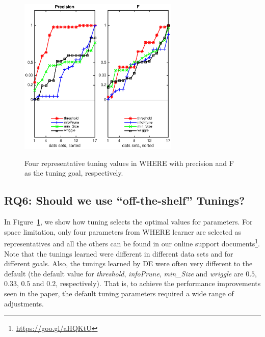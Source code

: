 \documentclass{sig-alternative}
\newcommand{\fig}[1]{Figure~\ref{fig:#1}}
\begin{document}
\begin{figure}[!t]
\begin{center}
\includegraphics[width=1.5in]{./eps/features_precision.eps}\includegraphics[width=1.5in]{./eps/features_F.eps}
 \end{center}
\caption{Four representative tuning values in WHERE with  precision and F as the tuning goal, respectively.   }\label{fig:features}
 \end{figure}


\subsection{RQ6: Should we use ``off-the-shelf'' Tunings?}\label{sect:variance}
 
 In \fig{features}, we show how tuning selects the optimal values for parameters. For space limitation, only four parameters from WHERE learner are selected as representatives and all the others can be found in our online support documents\footnote{\url{https://goo.gl/aHQKtU}}.
 Note that
 the tunings learned were different in different data sets and for different goals.
Also, the tunings learned by DE
were often very different to the default (the default value for {\em threshold}, {\em infoPrune}, {\em min\_Size} and {\em wriggle} are $0.5$, $0.33$, $0.5$ and $0.2$, respectively). That is, to achieve the performance improvements seen in the paper,
the default tuning parameters required a wide range of adjustments.
\end{document}
